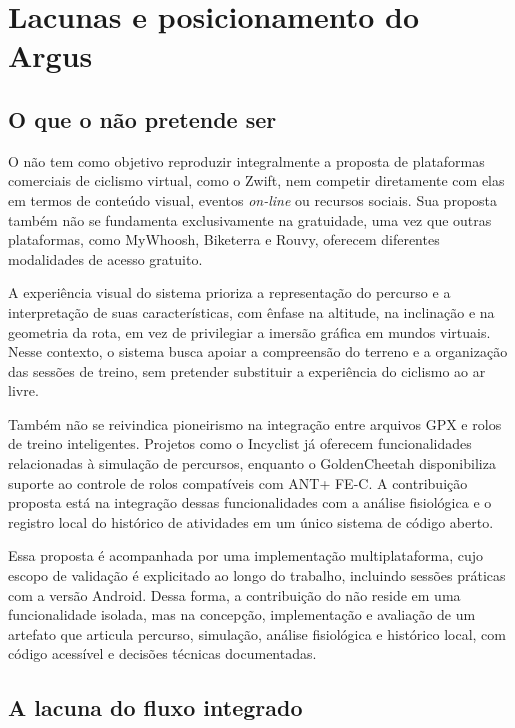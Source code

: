 \section{Lacunas e posicionamento do Argus}
\label{sec:lacunas-posicionamento}

\subsection{O que o \argus{} não pretende ser}
\label{sec:nao-pretende}

O \argus{} não tem como objetivo reproduzir integralmente a proposta de
plataformas comerciais de ciclismo virtual, como o Zwift, nem competir
diretamente com elas em termos de conteúdo visual, eventos \textit{on-line} ou
recursos sociais. Sua proposta também não se fundamenta exclusivamente na
gratuidade, uma vez que outras plataformas, como MyWhoosh, Biketerra e Rouvy,
oferecem diferentes modalidades de acesso gratuito.

A experiência visual do sistema prioriza a representação do percurso e a
interpretação de suas características, com ênfase na altitude, na inclinação e
na geometria da rota, em vez de privilegiar a imersão gráfica em mundos
virtuais. Nesse contexto, o sistema busca apoiar a compreensão do terreno e a
organização das sessões de treino, sem pretender substituir a experiência do
ciclismo ao ar livre.

Também não se reivindica pioneirismo na integração entre arquivos GPX e rolos
de treino inteligentes. Projetos como o Incyclist já oferecem funcionalidades
relacionadas à simulação de percursos, enquanto o GoldenCheetah disponibiliza
suporte ao controle de rolos compatíveis com ANT+ FE-C. A contribuição proposta
está na integração dessas funcionalidades com a análise fisiológica e o registro
local do histórico de atividades em um único sistema de código aberto.

Essa proposta é acompanhada por uma implementação multiplataforma, cujo escopo
de validação é explicitado ao longo do trabalho, incluindo sessões práticas com
a versão Android. Dessa forma, a contribuição do \argus{} não reside em uma
funcionalidade isolada, mas na concepção, implementação e avaliação de um
artefato que articula percurso, simulação, análise fisiológica e histórico
local, com código acessível e decisões técnicas documentadas.

\subsection{A lacuna do fluxo integrado}
\label{sec:lacuna-fluxo}

